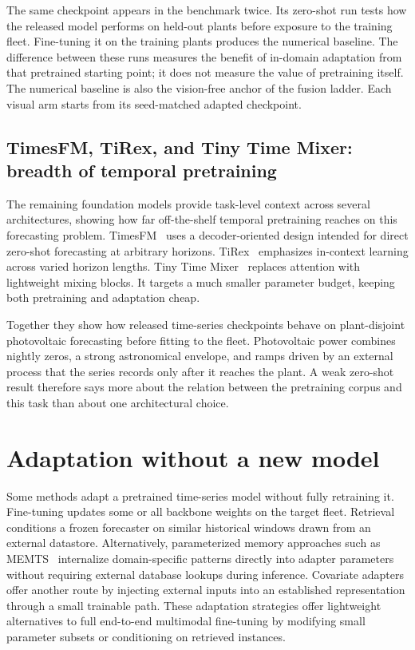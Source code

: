 The same checkpoint appears in the benchmark twice. Its zero-shot run tests how the released model performs on held-out plants before exposure to the training fleet. Fine-tuning it on the training plants produces the numerical baseline. The difference between these runs measures the benefit of in-domain adaptation from that pretrained starting point; it does not measure the value of pretraining itself. The numerical baseline is also the vision-free anchor of the fusion ladder. Each visual arm starts from its seed-matched adapted checkpoint.

\subsection{TimesFM, TiRex, and Tiny Time Mixer: breadth of temporal pretraining}
\label{sec:rw-tsfm-breadth}

The remaining foundation models provide task-level context across several architectures, showing how far off-the-shelf temporal pretraining reaches on this forecasting problem. TimesFM~\cite{timesfm} uses a decoder-oriented design intended for direct zero-shot forecasting at arbitrary horizons. TiRex~\cite{tirex} emphasizes in-context learning across varied horizon lengths. Tiny Time Mixer~\cite{ttm} replaces attention with lightweight mixing blocks. It targets a much smaller parameter budget, keeping both pretraining and adaptation cheap.

Together they show how released time-series checkpoints behave on plant-disjoint photovoltaic forecasting before fitting to the fleet. Photovoltaic power combines nightly zeros, a strong astronomical envelope, and ramps driven by an external process that the series records only after it reaches the plant. A weak zero-shot result therefore says more about the relation between the pretraining corpus and this task than about one architectural choice.

\section{Adaptation without a new model}
\label{sec:rw-adaptation}

Some methods adapt a pretrained time-series model without fully retraining it. Fine-tuning updates some or all backbone weights on the target fleet. Retrieval conditions a frozen forecaster on similar historical windows drawn from an external datastore. Alternatively, parameterized memory approaches such as MEMTS~\cite{memts} internalize domain-specific patterns directly into adapter parameters without requiring external database lookups during inference. Covariate adapters offer another route by injecting external inputs into an established representation through a small trainable path. These adaptation strategies offer lightweight alternatives to full end-to-end multimodal fine-tuning by modifying small parameter subsets or conditioning on retrieved instances.

